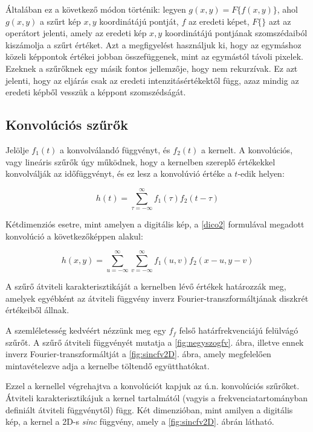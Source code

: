 \documentclass[a4paper,12pt]{article}
\begin{document}
Általában ez a következő módon történik: legyen $g(x,y)=F\lbrace f(x,y)\rbrace
$, ahol $g(x,y)$ a szűrt kép $x,y$ koordinátájú pontját, $f$ az eredeti képet,
$F\lbrace \rbrace$ azt az operátort jelenti, amely az eredeti kép $x,y$
koordinátájú pontjának szomszédaiból kiszámolja a szűrt értéket. Azt a
megfigyelést használjuk ki, hogy az egymáshoz közeli képpontok értékei jobban
összefüggenek, mint az egymástól távoli pixelek. Ezeknek a szűrőknek egy másik
fontos jellemzője, hogy nem rekurzívak. Ez azt jelenti, hogy az eljárás csak az
eredeti intenzitásértékektől függ, azaz mindig az eredeti képből vesszük a
képpont szomszédságát. 


\subsection{Konvolúciós szűrők}

Jelölje $f_1(t)$ a konvolválandó függvényt, és $f_2(t)$ a kernelt. A
konvolúciós, vagy lineáris szűrők úgy működnek, hogy a kernelben szereplő
értékekkel konvolválják az időfüggvényt, és ez lesz a konvolúvió értéke a
$t$-edik helyen:

\begin{equation} \label{dico2}
h(t)=\sum_{\tau=-\infty}^{\infty}f_1(\tau)f_2(t-\tau)
\end{equation}

Kétdimenziós esetre, mint amelyen a digitális kép, a \ref{dico2} formulával
megadott konvolúció a következőképpen alakul:

\begin{equation} \label{dico3}
h(x,y)=\sum_{u =-\infty}^{\infty} \sum_{v =-\infty}^{\infty}f_1(u,v)f_2(x-u,
y-v)
\end{equation}


A szűrő átviteli karakterisztikáját a kernelben lévő értékek határozzák meg,
amelyek egyébként az átviteli függvény inverz Fourier-transzformáltjának
diszkrét értékeiből állnak.

A szemléletesség kedvéért nézzünk meg egy $f_f$ felső határfrekvenciájú
felülvágó szűrőt. A szűrő átviteli függvényét mutatja a \ref{fig:negyszogfv}.
ábra, illetve ennek inverz Fourier-transzformáltját a \ref{fig:sincfv2D}. ábra,
amely megfelelően mintavételezve adja a kernelbe töltendő együtthatókat. 

Ezzel a kernellel végrehajtva a konvolúciót kapjuk az ú.n. konvolúciós szűrőket.
Átviteli karakterisztikájuk a kernel tartalmától (vagyis a
frekvenciatartományban definiált átviteli függvénytől) függ. Két dimenzióban,
mint amilyen a digitális kép, a kernel a 2D-s \textit{sinc} függvény, amely a  
\ref{fig:sincfv2D}. ábrán látható.
\end{document}
